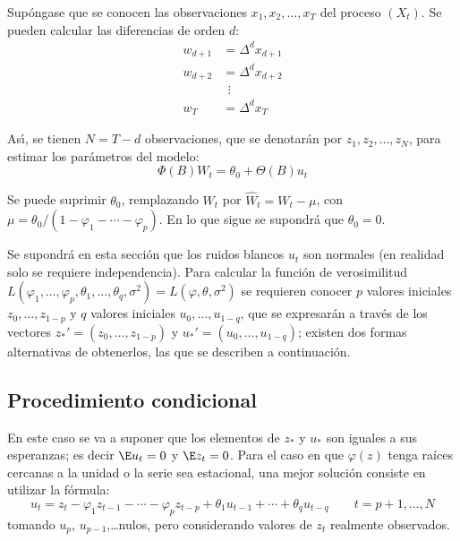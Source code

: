 Sup\'{o}ngase que se conocen las observaciones $x_{1}, x_{2},\ldots ,x_{T}$ del proceso $(X_{t})$. Se pueden calcular las diferencias de orden $d$:
\begin{align*}
 w_{d+1}&=\Delta^{d}x_{d+1}\\
 w_{d+2}&=\Delta^{d}x_{d+2}\\
 &\ \ \vdots \\
 w_{T}&=\Delta^{d}x_{T}
\end{align*}


As\'{\i}, se tienen $N=T- d$ observaciones, que se denotar\'{a}n por 
$z_{1} ,z_{2} ,\ldots,z_{N} $, para estimar los par\'{a}metros del modelo:
\[
\Phi (B) W_{t} = \theta_{0} + \Theta (B)u_{t} 
\]

Se puede suprimir $\theta_{0}$, remplazando $W_{t}$ por $\widehat W_{t} =W_{t} -\mu$, con $\mu =\theta_{0}/\left( {1-\varphi_{1} -\cdots -\varphi_{p} } \right)$. En lo que sigue se supondr\'{a} que $\theta_{0}= 0$.

Se supondr\'{a} en esta secci\'{o}n que los ruidos blancos $u_{t} $ son 
normales (en realidad solo se requiere independencia). Para calcular la 
funci\'{o}n de verosimilitud $L\left( {\varphi_{1} ,\ldots, \varphi 
_{p} ,\theta_{1} ,\ldots, \theta_{q} ,\sigma^{2}} \right)=L\left( 
{\varphi ,\theta ,\sigma^{2}} \right)$ se requieren conocer $p$ valores 
iniciales $z_{0} ,\ldots,z_{1-p} $ y $q$ valores iniciales $u_{0} 
,\ldots,u_{1-q}$, que se expresar\'{a}n a trav\'{e}s de los 
vectores $z_{\ast }' =\left( {z_{0} ,\ldots, z_{1-p} } \right)$ y $u_{\ast }' =\left( {u_{0} ,\ldots,u_{1-q} } \right)$; existen dos formas alternativas de obtenerlos, las que se describen a continuaci\'{o}n.



\subsection{Procedimiento condicional}

En este caso se va a suponer que los elementos de $z_{\ast }$ y $u_{\ast } $ son iguales a sus esperanzas; es decir $\E u_{t} =0$ y $\E z_{t} =0$. Para el caso en que $\varphi \left( z \right)$ tenga ra\'{i}ces cercanas a la unidad o la serie sea estacional, una mejor soluci\'{o}n consiste en utilizar la f\'{o}rmula:
\[
u_{t} =z_{t} -\varphi_{1} z_{t-1} -\cdots -\varphi_{p} z_{t-p} 
+\theta_{1} u_{t-1} +\cdots +\theta_{q} u_{t-q} \qquad t=p+1,\ldots ,N
\]
tomando $u_{p} $, $u_{p-1}$,\dots nulos, pero considerando 
valores de $z_{t} $ realmente observados.

